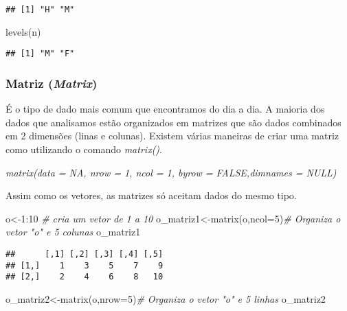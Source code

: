 \documentclass[
]{book}
\newenvironment{Shaded}{\begin{snugshade}}{\end{snugshade}}
\newcommand{\AttributeTok}[1]{\textcolor[rgb]{0.77,0.63,0.00}{#1}}
\newcommand{\CommentTok}[1]{\textcolor[rgb]{0.56,0.35,0.01}{\textit{#1}}}
\newcommand{\DecValTok}[1]{\textcolor[rgb]{0.00,0.00,0.81}{#1}}
\newcommand{\FunctionTok}[1]{\textcolor[rgb]{0.00,0.00,0.00}{#1}}
\newcommand{\NormalTok}[1]{#1}
\newcommand{\OtherTok}[1]{\textcolor[rgb]{0.56,0.35,0.01}{#1}}
\newcommand{\SpecialCharTok}[1]{\textcolor[rgb]{0.00,0.00,0.00}{#1}}
\begin{document}
\begin{verbatim}
## [1] "H" "M"
\end{verbatim}

\begin{Shaded}
\begin{Highlighting}[]
\FunctionTok{levels}\NormalTok{(n)}
\end{Highlighting}
\end{Shaded}

\begin{verbatim}
## [1] "M" "F"
\end{verbatim}

\hypertarget{matriz-matrix}{%
\subsubsection{\texorpdfstring{Matriz (\emph{Matrix})}{Matriz (Matrix)}}\label{matriz-matrix}}

É o tipo de dado mais comum que encontramos do dia a dia. A maioria dos dados que analisamos estão organizados em matrizes que são dados combinados em 2 dimensões (linas e colunas).
Existem várias maneiras de criar uma matriz como utilizando o comando \emph{matrix()}.

\emph{\emph{matrix(data = NA, nrow = 1, ncol = 1, byrow = FALSE,dimnames = NULL)}}

Assim como os vetores, as matrizes só aceitam dados do mesmo tipo.

\begin{Shaded}
\begin{Highlighting}[]
\NormalTok{o}\OtherTok{\textless{}{-}}\DecValTok{1}\SpecialCharTok{:}\DecValTok{10} \CommentTok{\# cria um vetor de 1 a 10}
\NormalTok{o\_matriz1}\OtherTok{\textless{}{-}}\FunctionTok{matrix}\NormalTok{(o,}\AttributeTok{ncol=}\DecValTok{5}\NormalTok{)}\CommentTok{\# Organiza o vetor "o" e 5 colunas}
\NormalTok{o\_matriz1}
\end{Highlighting}
\end{Shaded}

\begin{verbatim}
##      [,1] [,2] [,3] [,4] [,5]
## [1,]    1    3    5    7    9
## [2,]    2    4    6    8   10
\end{verbatim}

\begin{Shaded}
\begin{Highlighting}[]
\NormalTok{o\_matriz2}\OtherTok{\textless{}{-}}\FunctionTok{matrix}\NormalTok{(o,}\AttributeTok{nrow=}\DecValTok{5}\NormalTok{)}\CommentTok{\# Organiza o vetor "o" e 5 linhas}
\NormalTok{o\_matriz2}
\end{Highlighting}
\end{Shaded}
\end{document}
